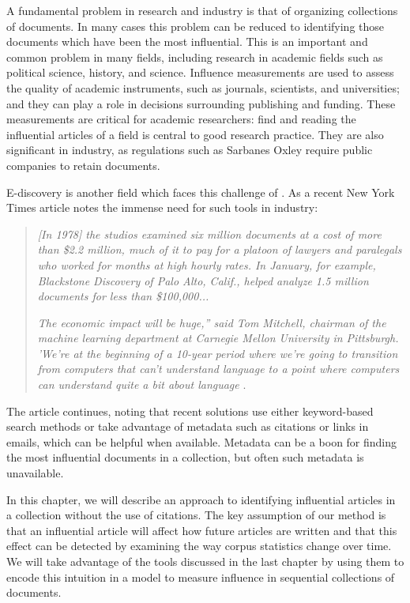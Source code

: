 \label{chapter:influence}

A fundamental problem in research and industry is that of organizing
collections of documents.  In many cases this problem can be reduced
to identifying those documents which have been the most influential.
This is an important and common problem in many fields, including
research in academic fields such as political science, history, and
science.  Influence measurements are used to assess the quality of
academic instruments, such as journals, scientists, and universities;
and they can play a role in decisions surrounding publishing and
funding. These measurements are critical for academic researchers:
find and reading the influential articles of a field is central to
good research practice.  They are also significant in industry, as
regulations such as Sarbanes Oxley require public companies to retain
documents.

E-discovery is another field which faces this challenge of .  As a
recent New York Times article notes the immense need for such tools in
industry:
\begin{quote}
  \emph{[In 1978] the studios examined six million documents at a
    cost of more than \$2.2 million, much of it to pay for a platoon
    of lawyers and paralegals who worked for months at high hourly
    rates.  In January, for example, Blackstone Discovery of Palo
    Alto, Calif., helped analyze 1.5 million documents for less than
    \$100,000...}

  \emph{The economic impact will be huge,” said Tom Mitchell, chairman
    of the machine learning department at Carnegie Mellon University
    in Pittsburgh. 'We’re at the beginning of a 10-year period where
    we’re going to transition from computers that can’t understand
    language to a point where computers can understand quite a bit
    about language} \cite{markoff:2011}.
\end{quote}

The article continues, noting that recent solutions use either
keyword-based search methods or take advantage of metadata such as
citations or links in emails, which can be helpful when available.
Metadata can be a boon for finding the most influential documents in a
collection, but often such metadata is unavailable.

In this chapter, we will describe an approach to identifying
influential articles in a collection without the use of citations.
The key assumption of our method is that an influential article will
affect how future articles are written and that this effect can be
detected by examining the way corpus statistics change over time.  We
will take advantage of the tools discussed in the last chapter by
using them to encode this intuition in a model to measure influence in
sequential collections of documents.

